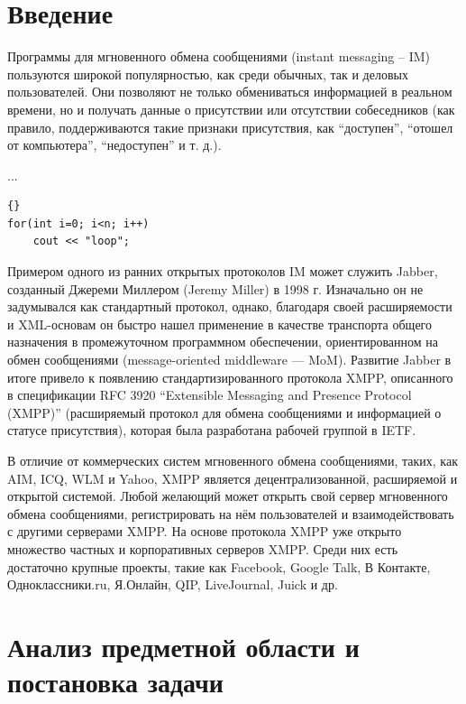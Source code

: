\documentclass{khaireport}
\begin{document}
\maketitle

\tableofcontents

\chapter*{Введение}
Программы для мгновенного обмена сообщениями (instant messaging – IM) пользуются широкой популярностью, как среди обычных, так и деловых пользователей. Они позволяют не только обмениваться информацией в реальном времени, но и получать данные о присутствии или отсутствии собеседников (как правило, поддерживаются такие признаки присутствия, как ``доступен'', ``отошел от компьютера'', ``недоступен'' и т. д.).

\lstset{language=C++}
...
\begin{lstlisting}{}
for(int i=0; i<n; i++)
    cout << "loop";
\end{lstlisting}

Примером одного из ранних открытых протоколов IM может служить Jabber, созданный Джереми Миллером (Jeremy Miller) в 1998 г. Изначально он не задумывался как стандартный протокол, однако, благодаря своей расширяемости и XML-основам он быстро нашел применение в качестве транспорта общего назначения в промежуточном программном обеспечении, ориентированном на обмен сообщениями (message-oriented middleware — MoM). Развитие Jabber в итоге привело к появлению стандартизированного протокола XMPP, описанного в спецификации RFC 3920 ``Extensible Messaging and Presence Protocol (XMPP)'' (расширяемый протокол для обмена сообщениями и информацией о статусе присутствия), которая была разработана рабочей группой в IETF.

В отличие от коммерческих систем мгновенного обмена сообщениями, таких, как AIM, ICQ, WLM и Yahoo, XMPP является децентрализованной, расширяемой и открытой системой. Любой желающий может открыть свой сервер мгновенного обмена сообщениями, регистрировать на нём пользователей и взаимодействовать с другими серверами XMPP. На основе протокола XMPP уже открыто множество частных и корпоративных серверов XMPP. Среди них есть достаточно крупные проекты, такие как Facebook, Google Talk, В Контакте, Одноклассники.ru, Я.Онлайн, QIP, LiveJournal, Juick и др.

\chapter{Анализ предметной области и постановка задачи}
\end{document}
